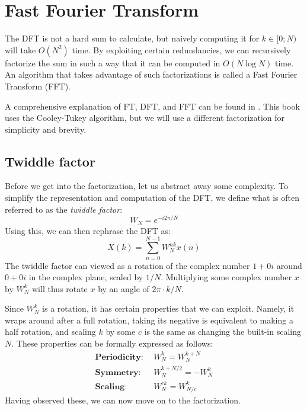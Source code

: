 \section{Fast Fourier Transform\label{sec:fft}}
The DFT is not a hard sum to calculate,
but naively computing it for $k \in [0;N)$ will take $O(N^2)$ time.
By exploiting certain redundancies,
we can recursively factorize the sum in such a way that it can be computed in $O(N \log N)$ time.
An algorithm that takes advantage of such factorizations is called a Fast Fourier Transform (FFT).

A comprehensive explanation of FT, DFT, and FFT can be found in \cite{brunton}.
This book uses the Cooley-Tukey algorithm,
but we will use a different factorization for simplicity and brevity.

\subsection{Twiddle factor}
Before we get into the factorization, let us abstract away some complexity.
To simplify the representation and computation of the DFT,
we define what is often referred to as the \textit{twiddle factor}:
\begin{equation}
    W_N = e^{-i 2 \pi / N}
\end{equation}
Using this, we can then rephrase the DFT as:
\begin{equation}
    X(k) = \sum_{n = 0}^{N - 1} W_N^{nk} x(n)
\end{equation}
%
The twiddle factor can viewed as a rotation of the complex number $1 + 0i$
around $0 + 0i$ in the complex plane, scaled by $1/N$.
Multiplying some complex number $x$ by $W_N^k$
will thus rotate $x$ by an angle of $2 \pi \cdot k/N$.

Since $W_N^k$ is a rotation,
it has certain properties that we can exploit.
Namely, it wraps around after a full rotation,
taking its negative is equivalent to making a half rotation,
and scaling $k$ by some $c$ is the same as changing the built-in scaling $N$.
These properties can be formally expressed as follows:
\begin{align}
    \textbf{Periodicity:} &~~W^k_N = W^{k + N}_N\\
    \textbf{Symmetry:}    &~~W^{k + N/2}_N = -W^k_N\\
    \textbf{Scaling:}     &~~W_N^{ck} = W_{N/c}^{k}
\end{align}
Having observed these, we can now move on to the factorization.

